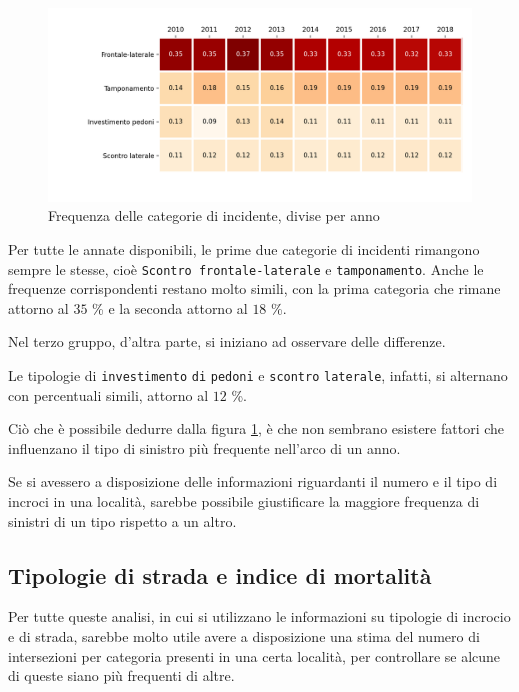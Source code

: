 \documentclass[a4paper]{report}
\newcommand{\columnstyle}[1]{\texttt{#1}}
\begin{document}
\begin{figure}
    \includegraphics[width=\linewidth]{../src/incidenti/incidenti_senza_coords/localizzazione_incidente/rapporto_tipologie.png}
    \caption{Frequenza delle categorie di incidente, divise per anno}
    \label{fig:rapporto-tipologie}
\end{figure}

Per tutte le annate disponibili, le prime due categorie di incidenti rimangono sempre 
le stesse, cioè \columnstyle{Scontro frontale-laterale} e \columnstyle{tamponamento}. 
Anche le frequenze corrispondenti restano molto simili, con la prima 
categoria che rimane attorno al $35$ \% e la seconda attorno al $18$ \%. 

Nel terzo gruppo, d'altra parte, si iniziano ad osservare delle differenze. 

Le tipologie di \columnstyle{investimento} \columnstyle{di} \columnstyle{pedoni} e 
\columnstyle{scontro} \columnstyle{laterale}, 
infatti, si alternano con percentuali simili, attorno al $12$ \%. 

Ciò che è possibile dedurre dalla figura \ref{fig:rapporto-tipologie}, è che non 
sembrano esistere fattori che influenzano il tipo di sinistro più frequente 
nell'arco di un anno.

Se si avessero a disposizione delle informazioni riguardanti il numero e il tipo 
di incroci in una località, sarebbe possibile giustificare 
la maggiore frequenza di sinistri di un tipo rispetto a un altro. 

\subsection{Tipologie di strada e indice di mortalità}

Per tutte queste analisi, in cui si utilizzano le informazioni su tipologie 
di incrocio e di strada, 
sarebbe molto utile avere a disposizione una stima del numero di intersezioni 
per categoria presenti in una certa località, 
per controllare se alcune di queste siano più frequenti di altre. 
\end{document}

